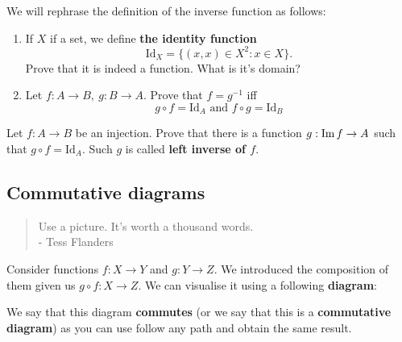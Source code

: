 \begin{exercise} We will rephrase the definition of the inverse function as follows:
	\begin{enumerate}
		\item If $X$ if a set, we define \textbf{the identity function}
			$$\text{Id}_X=\{(x,x)\in X^2 : x\in X\}.$$
			Prove that it is indeed a function. What is it's domain?
		\item Let $f:A\to B,~g:B\to A$. Prove that $f=g^{-1}$ iff
			$$g\circ f = \text{Id}_A \text{ and } f\circ g = \text{Id}_B$$
	\end{enumerate}
\end{exercise}

\begin{exercise}
  Let $f: A\to B$ be an injection. Prove that there is a function
  $g: \text{Im\,} f \to A$ such that $g\circ f = \text{Id}_A.$
  Such $g$ is called \textbf{left inverse of $f$}.
\end{exercise}

\subsection{Commutative diagrams}
\begin{quote}
  Use a picture. It's worth a thousand words.\\
  - Tess Flanders
\end{quote}

Consider functions $f:X\to Y$ and $g:Y\to Z$. We introduced the composition of them given us $g\circ f: X\to Z$. We can visualise it using a following \textbf{diagram}:

\begin{figure}
  \centering
\end{figure}

We say that this diagram \textbf{commutes} (or we say that this is a \textbf{commutative diagram}) as you can use follow any path and obtain the same result.
